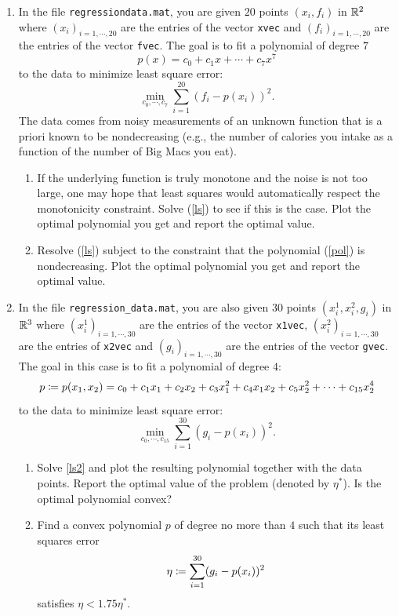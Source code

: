 \newpage
\pb
\begin{enumerate}[leftmargin=*]
\item In the file \texttt{regression\textunderscore data.mat}, you are given $20$ points $(x_{i}, f_{i})$ in $\mathbb{R}^{2}$ where $(x_{i})_{i=1,\cdots,20}$ are the entries of the vector \texttt{xvec} and $(f_{i})_{i=1,\cdots,20}$ are the entries of the vector \texttt{fvec}. The goal is to fit a polynomial of degree $7$ \begin{equation}\label{pol} p(x) = c_{0} +c_{1}x+\cdots+c_{7}x^{7}\end{equation} to the data to minimize least square error: \begin{equation}\label{ls}\min_{c_{0},\cdots,c_{7}} \sum_{i=1}^{20}(f_{i}-p(x_{i}))^{2}.\end{equation} The data comes from noisy measurements of an unknown function that is a priori known to be nondecreasing (e.g., the number of calories you intake as a function of the number of Big Macs you eat).
\begin{enumerate}[label=(\alph*)]
\item If the underlying function is truly monotone and the noise is not too large, one may hope that least squares would automatically respect the monotonicity constraint. Solve (\ref{ls}) to see if this is the case. Plot the optimal polynomial you get and report the optimal value.
\item Resolve (\ref{ls}) subject to the constraint that the polynomial (\ref{pol}) is nondecreasing. Plot the optimal polynomial you get and report the optimal value.
\end{enumerate}
\item In the file \texttt{regression\_data.mat}, you are also given $30$ points $(x^{1}_{i} , x^{2}_{i} , g_{i})$ in $\mathbb{R}^{3}$ where $(x^{1}_{i})_{i=1,\cdots,30}$ are the entries of the vector \texttt{x1vec}, $(x^{2}_{i})_{i=1,\cdots,30}$ are the entries of \texttt{x2vec} and $(g_{i})_{i=1,\cdots,30}$ are the entries of the vector \texttt{gvec}. The goal in this case is to fit a polynomial of degree $4$: $$p\coloneqq p(x_{1},x_{2}) = c_{0}+c_{1}x_{1} + c_{2}x_{2}+ c_{3}x_{1}^{2}+ c_{4}x_{1}x_{2}+c_{5}x_{2}^{2}+\cdots+c_{15}x_{2}^{4}$$ to the data to minimize least square error: \begin{equation}\label{ls2}
\min_{c_{0},\cdots,c_{15}} \sum_{i=1}^{30}(g_{i}-p(x_{i}))^{2}.
\end{equation}
\begin{enumerate}[label=(\alph*)]
\item Solve \ref{ls2} and plot the resulting polynomial together with the data points. Report the optimal value of the problem (denoted by $\eta^{*}$). Is the optimal polynomial convex?
\item Find a convex polynomial $p$ of degree no more than $4$ such that its least squares error $$\eta\coloneqq \sum_{i=1}^{30}(g_{i}-p(x_{i}))^{2}$$ satisfies $\eta < 1.75\eta^{*}$.
\end{enumerate}
\end{enumerate}

